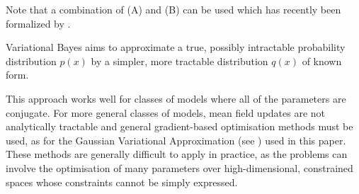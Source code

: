 Note that a combination of (A) and (B) can be used which has recently been formalized by \cite{Rohde2015}.

\noindent Variational Bayes aims to approximate a true, possibly intractable probability distribution $p(x)$
by a simpler, more tractable distribution $q(x)$ of known form.

This approach works well for classes of models where all of the parameters are conjugate. For more
general classes of models, mean field updates are not analytically tractable and general gradient-based
optimisation methods must be used, as for the Gaussian Variational Approximation (see \citep{Ormerod2012}) used
in this paper. These methods are generally difficult to apply in practice, as the problems can involve the
optimisation of many parameters over high-dimensional, constrained spaces whose constraints cannot be simply
expressed.









